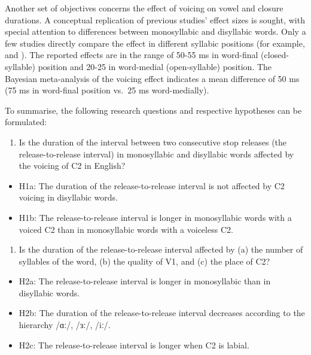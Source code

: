 \documentclass[
  12pt,
  a4paper,
]{article}
\providecommand{\tightlist}{%
  \setlength{\itemsep}{0pt}\setlength{\parskip}{0pt}}
\begin{document}
Another set of objectives concerns the effect of voicing on vowel and
closure durations. A conceptual replication of previous studies' effect
sizes is sought, with special attention to differences between
monosyllabic and disyllabic words. Only a few studies directly compare
the effect in different syllabic positions (for example,
\citet{sharf1962} and \citet{klatt1973}). The reported effects are in
the range of 50-55 ms in word-final (closed-syllable) position and 20-25
in word-medial (open-syllable) position. The Bayesian meta-analysis of
the voicing effect indicates a mean difference of 50 ms (75 ms in
word-final position vs.~25 ms word-medially).

To summarise, the following research questions and respective hypotheses
can be formulated:

\begin{enumerate}
\def\labelenumi{\arabic{enumi}.}
\tightlist
\item
  Is the duration of the interval between two consecutive stop releases
  (the release-to-release interval) in monosyllabic and disyllabic words
  affected by the voicing of C2 in English?
\end{enumerate}

\begin{itemize}
\tightlist
\item
  H1a: The duration of the release-to-release interval is not affected
  by C2 voicing in disyllabic words.
\item
  H1b: The release-to-release interval is longer in monosyllabic words
  with a voiced C2 than in monosyllabic words with a voiceless C2.
\end{itemize}

\begin{enumerate}
\def\labelenumi{\arabic{enumi}.}
\setcounter{enumi}{1}
\tightlist
\item
  Is the duration of the release-to-release interval affected by (a) the
  number of syllables of the word, (b) the quality of V1, and (c) the
  place of C2?
\end{enumerate}

\begin{itemize}
\tightlist
\item
  H2a: The release-to-release interval is longer in monosyllabic than in
  disyllabic words.
\item
  H2b: The duration of the release-to-release interval decreases
  according to the hierarchy /ɑː/, /ɜː/, /iː/.
\item
  H2c: The release-to-release interval is longer when C2 is labial.
\end{itemize}
\end{document}

